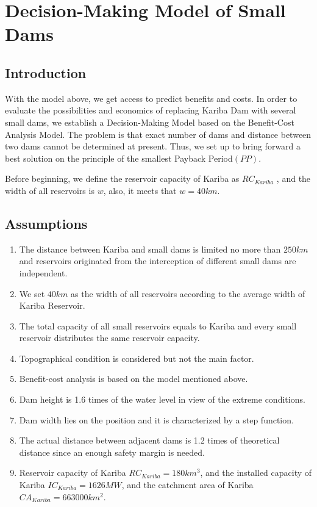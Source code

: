 \documentclass[12pt]{article}%
\begin{document}
\section{Decision-Making Model of Small Dams}
\subsection{Introduction}
With the model above, we get access to predict benefits and costs. In order to evaluate the possibilities and economics of replacing Kariba Dam with several small dams, we establish a Decision-Making Model based on the Benefit-Cost Analysis Model. The problem is that exact number of dams and distance between two dams cannot be determined at present. Thus, we set up to bring forward a best solution on the principle of the smallest Payback Period$(PP)$.
\par
\noindent
\par
\noindent
Before beginning, we define the reservoir capacity of Kariba as $RC_{Kariba}$ , and the width of all reservoirs is $w$, also, it meets that $w=40km$.

\subsection{Assumptions}
\begin{enumerate}[1.]
	\item The distance between Kariba and small dams is limited no more than $250km$ and reservoirs originated from the interception of different small dams are independent.
	\item We set $40km$ as the width of all reservoirs according to the average width of Kariba Reservoir.
	\item The total capacity of all small reservoirs equals to Kariba and every small reservoir distributes the same reservoir capacity.
	\item Topographical condition is considered but not the main factor.
	\item Benefit-cost analysis is based on the model mentioned above.
	\item Dam height is 1.6 times of the water level in view of the extreme conditions.
	\item Dam width lies on the position and it is characterized by a step function.
	\item The actual distance between adjacent dams is 1.2 times of theoretical distance since an enough safety margin is needed.
	\item Reservoir capacity of Kariba $RC_{Kariba}=180km^3$, and the installed capacity of Kariba $IC_{Kariba}=1626MW$, and the catchment area of Kariba $CA_{Kariba}=663000km^2$.
\end{enumerate}
\end{document}
